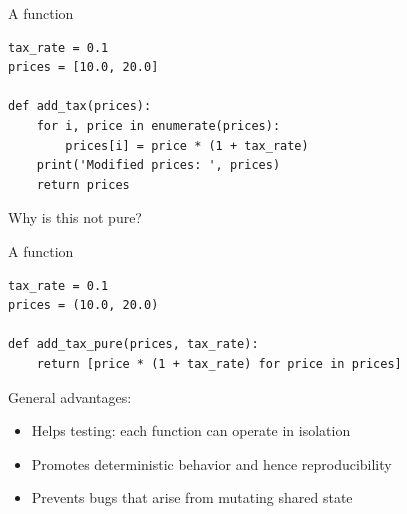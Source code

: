 \begin{frame}[fragile]

    A  function
    \vspace{0.5em}
    \vspace{0.5em}

    \begin{verbatim}
tax_rate = 0.1 
prices = [10.0, 20.0] 

def add_tax(prices):
    for i, price in enumerate(prices):
        prices[i] = price * (1 + tax_rate)    
    print('Modified prices: ', prices)
    return prices
    \end{verbatim}

    \vspace{0.5em}
    \vspace{0.5em}
    \vspace{0.5em}
    Why is this not pure?
    
\end{frame}



\begin{frame}[fragile]

    A  function
    \vspace{0.5em}
    \vspace{0.5em}

    \begin{verbatim}
tax_rate = 0.1 
prices = (10.0, 20.0) 

def add_tax_pure(prices, tax_rate):
    return [price * (1 + tax_rate) for price in prices]
    \end{verbatim}
    
\end{frame}


\begin{frame}

    General advantages:

    \begin{itemize}
        \item Helps testing: each function can operate in isolation
        \vspace{0.5em}
        \item Promotes deterministic behavior and hence reproducibility
        \vspace{0.5em}
        \item Prevents bugs that arise from mutating shared state
    \end{itemize}

\end{frame}



